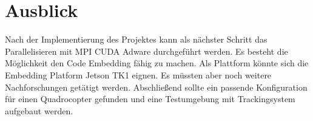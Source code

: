 \section{Ausblick}

Nach der Implementierung des Projektes kann als nächster Schritt das Parallelisieren mit MPI CUDA Adware durchgeführt werden. Es besteht die Möglichkeit den Code Embedding fähig zu machen. Als Plattform könnte sich die Embedding Platform Jetson TK1 eignen. Es müssten aber noch weitere Nachforschungen getätigt werden. Abschließend sollte ein passende Konfiguration für einen Quadrocopter gefunden und eine Testumgebung mit Trackingsystem aufgebaut werden. 